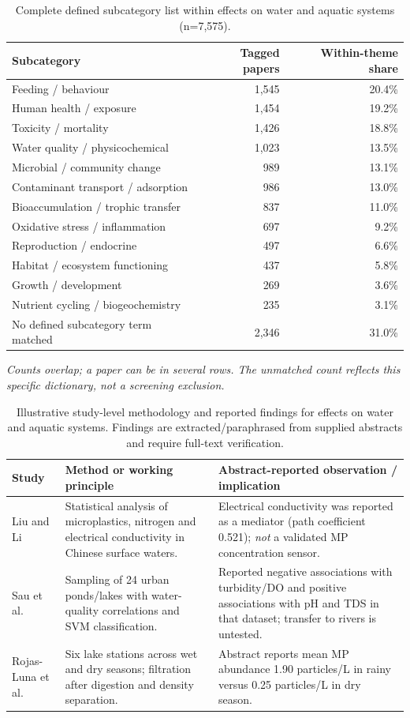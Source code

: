 \documentclass[10pt,a4paper]{article}
\begin{document}
\begin{table}[H]\centering\footnotesize
\caption{Complete defined subcategory list within effects on water and aquatic systems (n=7,575).}
\begin{tabularx}{\linewidth}{@{}Xrr@{}}\toprule Subcategory & Tagged papers & Within-theme share \\ \midrule
Feeding / behaviour & 1,545 & 20.4\% \\
Human health / exposure & 1,454 & 19.2\% \\
Toxicity / mortality & 1,426 & 18.8\% \\
Water quality / physicochemical & 1,023 & 13.5\% \\
Microbial / community change & 989 & 13.1\% \\
Contaminant transport / adsorption & 986 & 13.0\% \\
Bioaccumulation / trophic transfer & 837 & 11.0\% \\
Oxidative stress / inflammation & 697 & 9.2\% \\
Reproduction / endocrine & 497 & 6.6\% \\
Habitat / ecosystem functioning & 437 & 5.8\% \\
Growth / development & 269 & 3.6\% \\
Nutrient cycling / biogeochemistry & 235 & 3.1\% \\
\midrule
No defined subcategory term matched & 2,346 & 31.0\% \\
\bottomrule\end{tabularx}\end{table}
\noindent\footnotesize\emph{Counts overlap; a paper can be in several rows. The unmatched count reflects this specific dictionary, not a screening exclusion.}\normalsize
\begin{table}[H]\centering\scriptsize
\caption{Illustrative study-level methodology and reported findings for effects on water and aquatic systems. Findings are extracted/paraphrased from supplied abstracts and require full-text verification.}
\begin{tabularx}{\linewidth}{@{}p{2.8cm}XX@{}}\toprule Study & Method or working principle & Abstract-reported observation / implication \\ \midrule
Liu and Li \cite{MPWE00002} & Statistical analysis of microplastics, nitrogen and electrical conductivity in Chinese surface waters. & Electrical conductivity was reported as a mediator (path coefficient 0.521); \emph{not} a validated MP concentration sensor. \\[2pt]
Sau et al. \cite{MPWE02100} & Sampling of 24 urban ponds/lakes with water-quality correlations and SVM classification. & Reported negative associations with turbidity/DO and positive associations with pH and TDS in that dataset; transfer to rivers is untested. \\[2pt]
Rojas-Luna et al. \cite{MPWE00090} & Six lake stations across wet and dry seasons; filtration after digestion and density separation. & Abstract reports mean MP abundance 1.90 particles/L in rainy versus 0.25 particles/L in dry season. \\[2pt]
\bottomrule\end{tabularx}\end{table}
\clearpage
\end{document}
